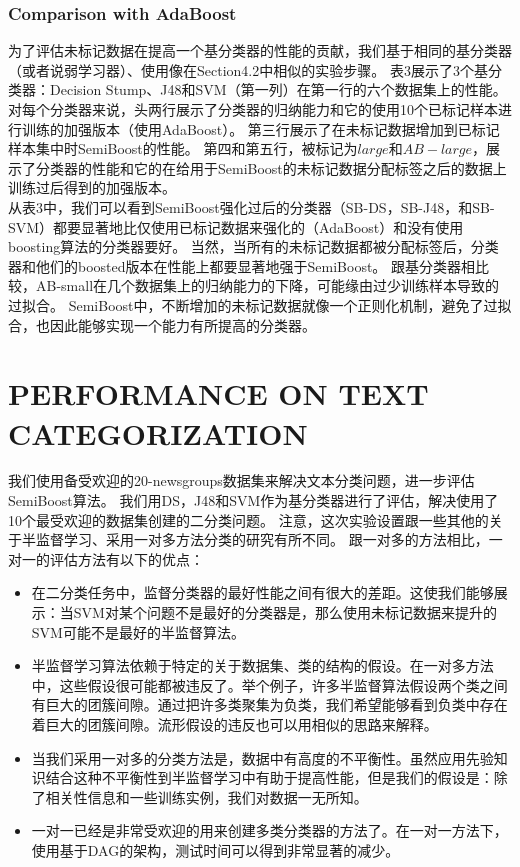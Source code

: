\documentclass[10pt,journal,compsoc]{IEEEtran}
\begin{document}
\subsubsection{Comparison with AdaBoost}
为了评估未标记数据在提高一个基分类器的性能的贡献，我们基于相同的基分类器（或者说弱学习器）、使用像在Section4.2中相似的实验步骤。
表3展示了3个基分类器：Decision Stump、J48和SVM（第一列）在第一行的六个数据集上的性能。
对每个分类器来说，头两行展示了分类器的归纳能力和它的使用10个已标记样本进行训练的加强版本（使用AdaBoost）。
第三行展示了在未标记数据增加到已标记样本集中时SemiBoost的性能。
第四和第五行，被标记为$large$和$AB-large$，展示了分类器的性能和它的在给用于SemiBoost的未标记数据分配标签之后的数据上训练过后得到的加强版本。\\

从表3中，我们可以看到SemiBoost强化过后的分类器（SB-DS，SB-J48，和SB-SVM）都要显著地比仅使用已标记数据来强化的（AdaBoost）和没有使用boosting算法的分类器要好。
当然，当所有的未标记数据都被分配标签后，分类器和他们的boosted版本在性能上都要显著地强于SemiBoost。
跟基分类器相比较，AB-small在几个数据集上的归纳能力的下降，可能缘由过少训练样本导致的过拟合。
SemiBoost中，不断增加的未标记数据就像一个正则化机制，避免了过拟合，也因此能够实现一个能力有所提高的分类器。

\section{PERFORMANCE ON TEXT CATEGORIZATION}
我们使用备受欢迎的20-newsgroups数据集来解决文本分类问题，进一步评估SemiBoost算法。
我们用DS，J48和SVM作为基分类器进行了评估，解决使用了10个最受欢迎的数据集创建的二分类问题。
注意，这次实验设置跟一些其他的关于半监督学习、采用一对多方法分类的研究有所不同。
跟一对多的方法相比，一对一的评估方法有以下的优点：
\begin{itemize}
\item 在二分类任务中，监督分类器的最好性能之间有很大的差距。这使我们能够展示：当SVM对某个问题不是最好的分类器是，那么使用未标记数据来提升的SVM可能不是最好的半监督算法。
\item 半监督学习算法依赖于特定的关于数据集、类的结构的假设。在一对多方法中，这些假设很可能都被违反了。举个例子，许多半监督算法假设两个类之间有巨大的团簇间隙。通过把许多类聚集为负类，我们希望能够看到负类中存在着巨大的团簇间隙。流形假设的违反也可以用相似的思路来解释。
\item 当我们采用一对多的分类方法是，数据中有高度的不平衡性。虽然应用先验知识结合这种不平衡性到半监督学习中有助于提高性能，但是我们的假设是：除了相关性信息和一些训练实例，我们对数据一无所知。
\item 一对一已经是非常受欢迎的用来创建多类分类器的方法了。在一对一方法下，使用基于DAG的架构，测试时间可以得到非常显著的减少。
\end{itemize}
\end{document}
